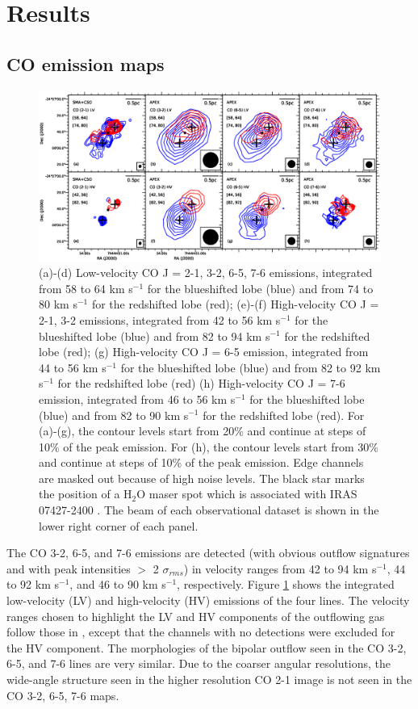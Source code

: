 \section{Results}
\subsection{CO emission maps}

\begin{figure}[htbp]
\includegraphics[scale=.65]{./fig/ori_contourall.eps}
\caption{(a)-(d) Low-velocity CO J = 2-1, 3-2, 6-5, 7-6 emissions, integrated from 58 to 64 km s$^{-1} $ for the blueshifted lobe (blue) and from 74 to 80 km s$^{-1}$ for the redshifted lobe (red); (e)-(f) High-velocity CO J = 2-1, 3-2 emissions,  integrated from 42 to 56 km s$^{-1} $ for the blueshifted lobe (blue) and from 82 to 94 km s$^{-1}$ for the redshifted lobe (red); (g) High-velocity CO J = 6-5 emission, integrated from 44 to 56 km s$^{-1} $ for the blueshifted lobe (blue) and from 82 to 92 km s$^{-1}$ for the redshifted lobe (red) (h) High-velocity CO J = 7-6 emission, integrated from 46 to 56 km s$^{-1} $ for the blueshifted lobe (blue) and from 82 to 90 km s$^{-1}$ for the redshifted lobe (red). For (a)-(g), the contour levels start from 20\% and continue at steps of 10\% of the peak emission. For (h), the contour levels start from 30\% and continue at steps of 10\% of the peak emission. Edge channels are masked out because of high noise levels. The black star marks the position of a H$_2$O maser spot which is associated with IRAS 07427-2400 \citep{2015PASJ...67...69S}. The beam of each observational dataset is shown in the lower right corner of each panel. \label{fig:figcontour}}
\end{figure}

The CO 3-2, 6-5, and 7-6 emissions are detected (with obvious outflow signatures and with peak intensities $>$ 2 $\sigma_{rms}$) in velocity ranges from 42 to 94 km s$^{-1}$, 44 to 92 km s$^{-1}$, and 46 to 90 km s$^{-1}$, respectively. Figure \ref{fig:figcontour} shows the integrated low-velocity (LV) and high-velocity (HV) emissions of the four lines. The velocity ranges chosen to highlight the LV and HV components of the outflowing gas follow those in \citet{2009ApJ...696...66Q}, except that the channels with no detections were excluded for the HV component. The morphologies of the bipolar outflow seen in the CO 3-2, 6-5, and 7-6 lines are very similar. Due to the coarser angular resolutions, the wide-angle structure seen in the higher resolution CO 2-1 image is not seen in the CO 3-2, 6-5, 7-6 maps.

